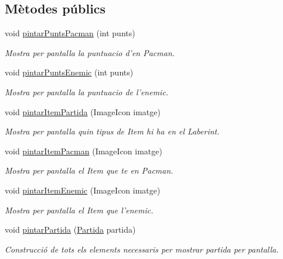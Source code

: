 \subsection*{Mètodes públics}
\begin{DoxyCompactItemize}
\item 
void \hyperlink{interfaceinterficie_1_1_i_pintador_partida_a65a58e702237296add7a42f92b89b311}{pintar\+Punts\+Pacman} (int punts)
\begin{DoxyCompactList}\small\item\em Mostra per pantalla la puntuacio d'en Pacman. \end{DoxyCompactList}\item 
void \hyperlink{interfaceinterficie_1_1_i_pintador_partida_a51fb8f48eb1d0d31fe72c7170c605d27}{pintar\+Punts\+Enemic} (int punts)
\begin{DoxyCompactList}\small\item\em Mostra per pantalla la puntuacio de l'enemic. \end{DoxyCompactList}\item 
void \hyperlink{interfaceinterficie_1_1_i_pintador_partida_a2c048da53f10afe918af218fa5dd9c46}{pintar\+Item\+Partida} (Image\+Icon imatge)
\begin{DoxyCompactList}\small\item\em Mostra per pantalla quin tipus de Item hi ha en el Laberint. \end{DoxyCompactList}\item 
void \hyperlink{interfaceinterficie_1_1_i_pintador_partida_ac3b9fc0a71e7a4c7807251389d24cf79}{pintar\+Item\+Pacman} (Image\+Icon imatge)
\begin{DoxyCompactList}\small\item\em Mostra per pantalla el Item que te en Pacman. \end{DoxyCompactList}\item 
void \hyperlink{interfaceinterficie_1_1_i_pintador_partida_a274911babd5c4c920bc1b8b8f5405256}{pintar\+Item\+Enemic} (Image\+Icon imatge)
\begin{DoxyCompactList}\small\item\em Mostra per pantalla el Item que l'enemic. \end{DoxyCompactList}\item 
void \hyperlink{interfaceinterficie_1_1_i_pintador_partida_acfed29e00f058ea0f08893c0d1a2f2e6}{pintar\+Partida} (\hyperlink{classlogica_1_1_partida}{Partida} partida)
\begin{DoxyCompactList}\small\item\em Construcció de tots els elements necessaris per mostrar partida per pantalla. \end{DoxyCompactList}\item 

\end{DoxyCompactItemize}
